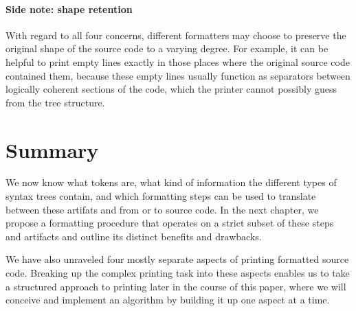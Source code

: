 \paragraph{Side note: shape retention}
With regard to all four concerns,
different formatters may choose to preserve
the original shape of the source code to a varying degree.
For example, it can be helpful to print empty lines
exactly in those places where the original source code contained them,
\autocite[Section: Empty lines]{prettierRationale}
because these empty lines usually function as
separators between logically coherent sections of the code,
which the printer cannot possibly guess from the tree structure.

\section{Summary}
We now know what tokens are,
what kind of information the different types of syntax trees contain,
and which formatting steps can be used to translate between these artifats
and from or to source code.
In the next chapter, we propose a formatting procedure
that operates on a strict subset of these steps and artifacts
and outline its distinct benefits and drawbacks.

We have also unraveled four mostly separate
aspects of printing formatted source code.
Breaking up the complex printing task into these aspects
enables us to take a structured approach to printing
later in the course of this paper,
where we will conceive and implement an algorithm
by building it up one aspect at a time.
